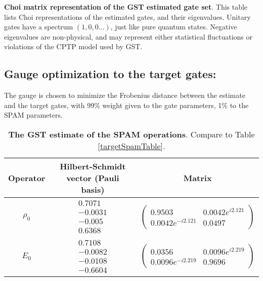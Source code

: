 {\begin{table}[h]
\begin{center}
\caption{\textbf{Choi matrix representation of the GST estimated gate set}.  This table lists Choi representations of the estimated gates, and their eigenvalues.  Unitary gates have a spectrum $(1,0,0\ldots)$, just like pure quantum states.  Negative eigenvalues are non-physical, and may represent either statistical fluctuations or violations of the CPTP model used by GST.\label{bestTargetSpamGatesetChoiTable}}
\end{center}
\end{table}

\clearpage

\subsection{Gauge optimization to the target gates:}
The gauge is chosen to minimize the Frobenius distance between the estimate and the target gates, with 99\% weight given to the gate parameters, 1\% to the SPAM parameters.


\begin{table}[h]
\begin{center}
\begin{tabular}[l]{|c|c|c|}
\hline
Operator & Hilbert-Schmidt vector (Pauli basis) & Matrix \\ \hline
$\rho_{0}$ & $ \begin{array}{c}
0.7071 \\ 
-0.0031 \\ 
-0.005 \\ 
0.6368
 \end{array} $
 & $ \left(\!\!\begin{array}{cc}
0.9503 & 0.0042e^{i2.121} \\ 
0.0042e^{-i2.121} & 0.0497
 \end{array}\!\!\right) $
 \\ \hline
$E_{0}$ & $ \begin{array}{c}
0.7108 \\ 
-0.0082 \\ 
-0.0108 \\ 
-0.6604
 \end{array} $
 & $ \left(\!\!\begin{array}{cc}
0.0356 & 0.0096e^{i2.219} \\ 
0.0096e^{-i2.219} & 0.9696
 \end{array}\!\!\right) $
 \\ \hline
\end{tabular}

\caption{\textbf{The GST estimate of the SPAM operations}.  Compare to Table \ref{targetSpamTable}.\label{bestTargetGatesGatesetSpamTable}}
\end{center}
\end{table}

}
